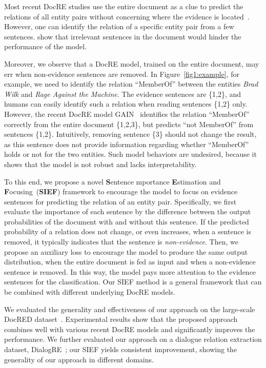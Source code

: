 \documentclass[11pt]{article}
\begin{document}
Most recent DocRE studies use the entire document as a clue to predict the relations of all entity pairs without concerning where the evidence is located~\cite{Nan2020ReasoningWL,zeng-etal-2020-double,xu-etal-2021-discriminative,docred-rec}. 
However, one can identify the relation of a specific entity pair from a few sentences.
\citet{huang-etal-2021-three} show that irrelevant sentences in the document would hinder the performance of the model. 

Moreover, we observe that a DocRE model, trained on the entire document, may err when non-evidence sentences are removed.
In Figure~\ref{fig1:example}, for example, we need to identify the relation ``MemberOf'' between the entities \textit{Brad Wilk} and \textit{Rage Against the Machine}.
The evidence sentences are \{1,2\}, and humans can easily identify such a relation when reading sentences \{1,2\} only.
However, the recent DocRE model GAIN~\cite{zeng-etal-2020-double} identifies the relation ``MemberOf'' correctly from the entire document \{1,2,3\}, but predicts ``not MemberOf'' from sentences \{1,2\}. 
Intuitively, removing sentence \{3\} should not change the result, as this sentence does not provide information regarding whether ``MemberOf'' holds or not for the two entities.
Such model behaviors are undesired, because it shows that the model is not robust and lacks interpretability. 

To this end, we propose a novel \textbf{S}entence mportance \textbf{E}stimation and \textbf{F}ocusing~(\textbf{SIEF}) framework to encourage the model to focus on evidence sentences for predicting the relation of an entity pair.
Specifically, we first evaluate the importance of each sentence by the difference between the output probabilities of the document with and without this sentence. If the predicted probability of a relation does not change, or even increases, when a sentence is removed, it typically indicates that the sentence is \textit{non-evidence}.
Then, we propose an auxiliary loss to encourage the model to produce the same output distribution, when the entire document is fed as input and when a non-evidence sentence is removed.
In this way, the model pays more attention to the evidence sentences for the classification.
Our SIEF method is a general framework that can be combined with different underlying DocRE models.

We evaluated the generality and effectiveness of our approach on the large-scale DocRED dataset~\cite{yao-etal-2019-docred}.
Experimental results show that the proposed approach combines well with various recent DocRE models and significantly improves the performance.
We further evaluated our approach on a dialogue relation extraction dataset, DialogRE~\cite{yu-etal-2020-dialogue}; our SIEF yields consistent improvement, showing the generality of our approach in different domains.
\end{document}
